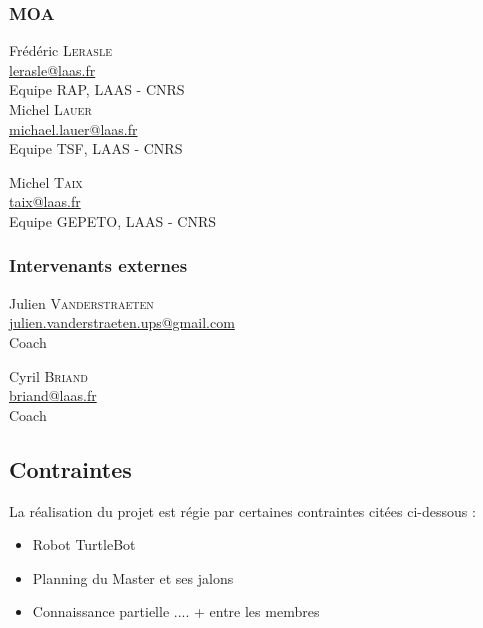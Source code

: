 \documentclass[10pt,a4paper]{article}
\begin{document}
\subsubsection{MOA}
\begin{minipage}[t]{0.46 \textwidth} 
Frédéric \textsc{Lerasle} \\
\href{mailto:lerasle@laas.fr}{lerasle@laas.fr} \\
Equipe RAP, LAAS - CNRS \\[0.3cm]
Michel \textsc{Lauer} \\
\href{mailto:michael.lauer@laas.fr}{michael.lauer@laas.fr} \\
Equipe TSF, LAAS - CNRS
\end{minipage} 
\hfill
\begin{minipage}[t]{0.46\textwidth} 
Michel \textsc{Taix} \\
\href{mailto:taix@laas.fr}{taix@laas.fr} \\
Equipe GEPETO, LAAS - CNRS
\end{minipage} 

\subsubsection{Intervenants externes}
\begin{minipage}[t]{0.46 \textwidth} 
Julien \textsc{Vanderstraeten} \\
\href{mailto:julien.vanderstraeten.ups@gmail.com
}{julien.vanderstraeten.ups@gmail.com} \\
Coach
\end{minipage} 
\hfill
\begin{minipage}[t]{0.46\textwidth} 
Cyril \textsc{Briand} \\
\href{mailto:briand@laas.fr}{briand@laas.fr} \\
Coach
\end{minipage} 

\subsection{Contraintes}
\noindent La réalisation du projet est régie par certaines contraintes citées ci-dessous : 
\begin{itemize}
\item Robot TurtleBot
\item Planning du Master et ses jalons 
\item Connaissance partielle .... + entre les membres

\end{itemize} 
\end{document}

